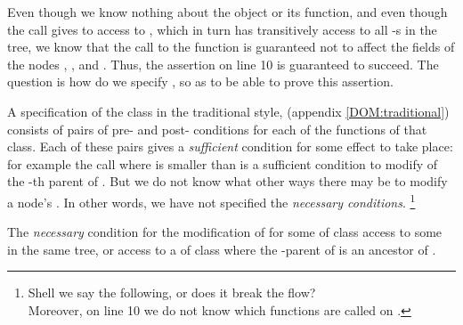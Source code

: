 Even though we know nothing about the  object or its  function, and even though the call gives to   access to , which in turn has transitively access to all  -s in the tree, 
we know that the call to the  function is guaranteed not to affect the    fields of the nodes , , and . 
Thus, the assertion on line 10 is guaranteed to succeed. 
The question is how do we specify , so as to be able to prove this assertion.

A  specification of the class  
in the traditional   style, \eg  \cite{Leavens-etal07} (\cf appendix \ref{DOM:traditional}) consists of pairs of pre- and post- conditions for each of the functions of that class. Each of these pairs gives a {\em sufficient} condition for some effect to take place: for example the call  where  is smaller than  is a sufficient condition to  modify    of the -th parent of . But we do not know what other ways there may be  to modify a node's  . In other words, we have not specified the \emph{necessary conditions}. \footnote{Shell we say the following, or does it break the flow? \\
Moreover, on line 10 we do not know which functions are called on .}

The \emph{necessary} condition for the modification of    for some  of class   access to some    in the same tree, or  access to a  of class  where the -parent of  is an ancestor of .
 